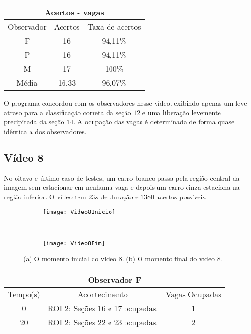 \begin{center}
\begin{tabular}{|c||c||c|}
\hline
\multicolumn{3}{|c|}{Acertos - vagas}  \\ \hline \hline
Observador & Acertos & Taxa de acertos \\ \hline
F & 16 & 94,11\% \\  \hline
P & 16 & 94,11\% \\ \hline
M & 17 & 100\% \\ \hline
Média & 16,33 & 96,07\% \\
\hline
\end{tabular}
\end{center}

O programa concordou com os observadores nesse vídeo, exibindo apenas um leve atraso para a classificação correta da seção $12$ e uma liberação levemente precipitada da seção $14$. A ocupação das vagas é determinada de forma quase idêntica a dos observadores.

\subsection{Vídeo 8}

No oitavo e último caso de testes, um carro branco passa pela região central da imagem sem estacionar em nenhuma vaga e depois um carro cinza estaciona na região inferior. O vídeo tem $23s$ de duração e $1380$ acertos possíveis.

\begin{figure}[!h]
\centering
\begin{subfigure}{.5\textwidth}
\centering
\texttt{[image: Video8Inicio]}
\caption{}
\end{subfigure}\
\begin{subfigure}{.5\textwidth}
\centering
\texttt{[image: Video8Fim]}
\caption{}
\end{subfigure}
\centering
\caption{(a) O momento inicial do vídeo 8. (b) O momento final do vídeo 8.}%
\label{}%
\end{figure}

\begin{center}
\begin{tabular}{|c||c||c|}
\hline
\multicolumn{3}{|c|}{Observador F}  \\ \hline \hline
Tempo(s) & Acontecimento & Vagas Ocupadas\\ \hline
0 & ROI 2: Seções 16 e 17 ocupadas. & 1 \\ \hline
20 & ROI 2: Seções 22 e 23 ocupadas. & 2 \\
\hline
\end{tabular}
\end{center}

